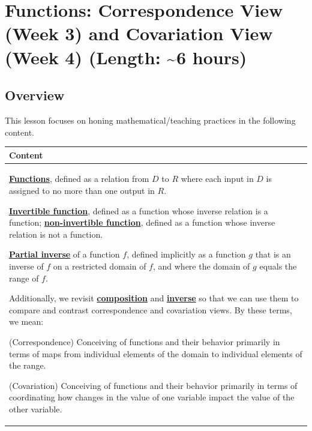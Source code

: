 \documentclass[11pt]{article}
\newcommand\about{\textasciitilde}
\renewcommand\emph[1]{\underline{\bf{#1}}} %
\theoremstyle{definition}
\begin{document}
\newpage
\section{Functions: Correspondence View (Week 3) and Covariation View (Week 4) (Length: \about 6 hours)}   \label{s: function correspondence}


\vspace*{-8pt}\subsection{Overview}

\vspace*{-8pt}
This lesson focuses on honing mathematical/teaching practices in the following content.

\vspace*{-4pt}
\begin{tabular}{L{6.5in}} 
{\bf Content} \\ \hline \parskip4pt
\emph{Functions}, defined as a relation from $D$ to $R$ where each input in $D$ is assigned to no more than one output in $R$.

\emph{Invertible function}, defined as a function whose inverse relation is a function; \emph{non-invertible function}, defined as a function whose inverse relation is not a function.

\emph{Partial inverse} of a function $f$, defined implicitly as a function $g$ that is an inverse of $f$ on a restricted domain of $f$, and where the domain of $g$ equals the range of $f$.

Additionally, we revisit \emph{composition} and \emph{inverse} so that we can use them to compare and contrast correspondence and covariation views. By these terms, we mean:
	\begin{itemize*}
	\item %
	(Correspondence) Conceiving of functions and their behavior primarily in terms of maps from individual elements of the domain to individual elements of the range. 
	\item %
	(Covariation) Conceiving of functions and their behavior primarily in terms of coordinating how changes in the value of one variable impact the value of the other variable.
	\end{itemize*} 
\end{tabular} 
\end{document}
